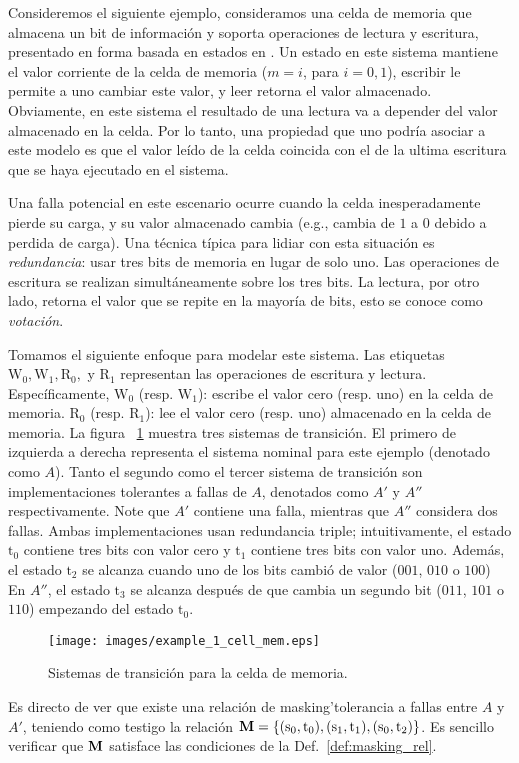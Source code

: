 \begin{exa}
Consideremos el siguiente ejemplo, consideramos una celda de memoria que almacena un bit de información y soporta operaciones de lectura y escritura, presentado en forma basada en estados en \cite{DemasiCMA17}. Un estado en este sistema mantiene el valor corriente de la celda de memoria ($m=i$, para $i=0,1$), escribir le permite a uno cambiar este valor, y leer retorna el valor almacenado.  
Obviamente, en este sistema el resultado de una lectura va a depender del valor almacenado en la celda. 
Por lo tanto, una propiedad que uno podría asociar a este modelo es que el valor leído de la celda coincida con el de la ultima escritura que se haya ejecutado en el sistema.
    
Una falla potencial en este escenario ocurre cuando la celda inesperadamente pierde su carga, y su valor almacenado cambia (e.g., cambia de $1$ a $0$ debido a perdida de carga). Una técnica típica para lidiar con esta situación es \emph{redundancia}: usar tres bits de memoria en lugar de solo uno. Las operaciones de escritura se realizan simultáneamente sobre los tres bits. La lectura, por otro lado, retorna el valor que se repite en la mayoría de bits, esto se conoce como \emph{votación}. 

Tomamos el siguiente enfoque para modelar este sistema. Las etiquetas $\text{W}_0, \text{W}_1, \text{R}_0,$ y $\text{R}_1$
representan las operaciones de escritura y lectura. Específicamente, $\text{W}_0$ (resp. $\text{W}_1$): escribe el valor cero (resp. uno) en la celda de memoria. $\text{R}_0$ (resp. $\text{R}_1$): lee el valor cero (resp. uno) almacenado en la celda de memoria.
La figura ~\ref{figure:exam_1_mem_cell} muestra tres sistemas de transición. El primero de izquierda a derecha representa el sistema nominal para este ejemplo (denotado como $A$).
Tanto el segundo como el tercer sistema de transición son implementaciones tolerantes a fallas de $A$, denotados como $A'$ y $A''$ respectivamente. Note que $A'$ contiene una falla, mientras que $A''$ considera dos fallas. Ambas implementaciones usan redundancia triple; intuitivamente, el estado $\text{t}_0$ contiene tres bits con valor cero y $\text{t}_1$ contiene tres bits con valor uno.
Además, el estado $\text{t}_2$ se alcanza cuando uno de los bits cambió de valor ($001$, $010$ o $100$)
En  $A''$, el estado $\text{t}_3$ se alcanza después de que cambia un segundo bit ($011$, $101$ o $110$) empezando del estado $\text{t}_0$.
\begin{figure}[h] 
\begin{center}
    \texttt{[image: images/example\_1\_cell\_mem.eps]} 
    \caption{Sistemas de transición para la celda de memoria.}
    \label{figure:exam_1_mem_cell}
\end{center}
\end{figure}
\sloppy Es directo de ver que existe una relación de masking'tolerancia a fallas entre $A$ y $A'$, teniendo como testigo la relación $\mathbin{\mathbf{M}} = \{(\text{s}_0, \text{t}_0), (\text{s}_1, \text{t}_1), (\text{s}_0, \text{t}_2)\}$. Es sencillo verificar que $\mathbin{\mathbf{M}}$ satisface las condiciones de la Def.~\ref{def:masking_rel}.


\end{exa}
